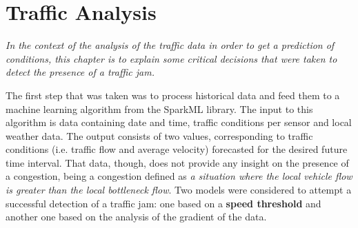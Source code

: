 \chapter{Traffic Analysis}
\textit{In the context of the analysis of the traffic data in order to get a prediction of conditions, this chapter is to explain some critical decisions that were taken to detect the presence of a traffic jam.}

\bigskip

The first step that was taken was to process historical data and feed them to a machine learning algorithm from the SparkML library. The input to this algorithm is data containing date and time, traffic conditions per sensor and local weather data. The output consists of two values, corresponding to traffic conditions (i.e. traffic flow and average velocity) forecasted for the desired future time interval. That data, though, does not provide any insight on the presence of a congestion, being a congestion defined as \textit{a situation where the local vehicle flow is greater than the local bottleneck flow}. Two models were considered to attempt a successful detection of a traffic jam: one based on a \textbf{speed threshold} and another one based on the analysis of the gradient of the data.